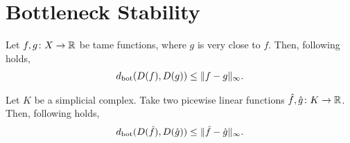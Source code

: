 \section{Bottleneck Stability}

\begin{lemma}
    Let $ f, g \colon X \to \mathbb R $ be tame functions, where $ g $ is very close to $ f $. Then, following holds,
    \begin{align}
        d_{\operatorname{bot}}(D(f), D(g)) \leq \|f - g \|_\infty.
    \end{align}
\end{lemma}

\begin{lemma}
    Let $ K $ be a simplicial complex. Take two picewise linear functions $ \hat f, \hat g \colon K \to \mathbb R $. Then, following holds,
    \begin{align}
        d_{\operatorname{bot}}(D(\hat f), D(\hat g)) \leq \|\hat f - \hat g \|_\infty.
    \end{align}
\end{lemma}

\Main*